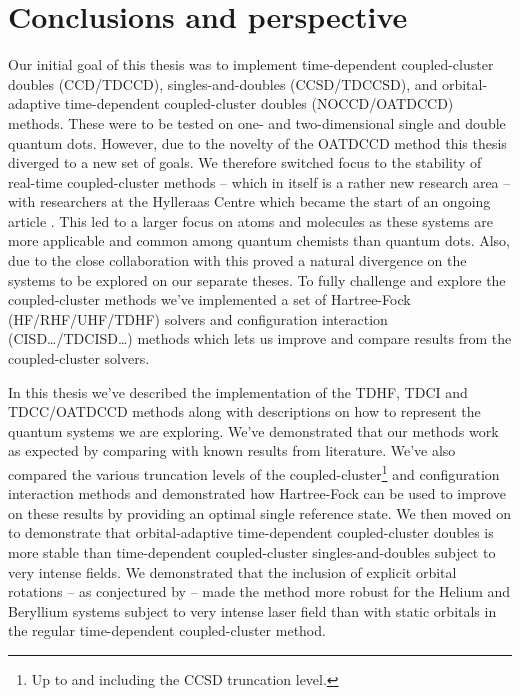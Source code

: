 \chapter{Conclusions and perspective}
    Our initial goal of this thesis was to implement time-dependent
    coupled-cluster doubles (CCD/TDCCD), singles-and-doubles (CCSD/TDCCSD), and
    orbital-adaptive time-dependent coupled-cluster doubles (NOCCD/OATDCCD)
    methods.
    These were to be tested on one- and two-dimensional single and double
    quantum dots.
    However, due to the novelty of the OATDCCD method this thesis diverged to a
    new set of goals.
    We therefore switched focus to the stability of real-time coupled-cluster
    methods -- which in itself is a rather new research area -- with researchers
    at the Hylleraas Centre which became the start of an ongoing article
    \cite{oa-stability}.
    This led to a larger focus on atoms and molecules as these systems are more
    applicable and common among quantum chemists than quantum dots.
    Also, due to the close collaboration with \citeauthor{greg-winther} this
    proved a natural divergence on the systems to be explored on our separate
    theses.
    To fully challenge and explore the coupled-cluster methods we've implemented
    a set of Hartree-Fock (HF/RHF/UHF/TDHF) solvers and configuration
    interaction (CISD\dots/TDCISD\dots) methods which lets us improve and
    compare results from the coupled-cluster solvers.

    In this thesis we've described the implementation of the TDHF, TDCI and
    TDCC/OATDCCD methods along with descriptions on how to represent the quantum
    systems we are exploring.
    We've demonstrated that our methods work as expected by comparing with known
    results from literature.
    We've also compared the various truncation levels of the
    coupled-cluster\footnote{%
        Up to and including the CCSD truncation level.
    }
    and configuration interaction methods and demonstrated how Hartree-Fock can
    be used to improve on these results by providing an optimal single reference
    state.
    We then moved on to demonstrate that orbital-adaptive time-dependent
    coupled-cluster doubles is more stable than time-dependent coupled-cluster
    singles-and-doubles subject to very intense fields.
    We demonstrated that the inclusion of explicit orbital rotations -- as
    conjectured by \citeauthor{pedersen2018symplectic}
    \cite{pedersen2018symplectic} -- made the method more robust for the Helium
    and Beryllium systems subject to very intense laser field than with static
    orbitals in the regular time-dependent coupled-cluster method.

